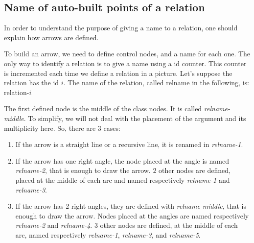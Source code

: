 \documentclass[a4paper,11pt]{report}
\begin{document}
\medskip

\begin{minipage}{0.5\textwidth}

\end{minipage}
\begin{minipage}{0.4\textwidth}
\begin{center}
\end{center}
\end{minipage}

\subsection{Name of auto-built points of a relation}\label{ss.relptname}

In order to understand the purpose of giving a name to a relation, one should explain how arrows are defined.

To build an arrow, we need to define control nodes, and a name for each one. The only way to identify a relation is to give a name using a id counter. This counter is incremented each time we define a relation in a picture.
Let's suppose the relation has the id $i$. The name of the relation, called relname in the following, is: relation-$i$

The first defined node is the middle of the class nodes. It is called {\it relname-middle}. To simplify, we will not deal with the placement of the argument and its multiplicity here. So, there are 3 cases:

\begin{enumerate}
\item If the arrow is a straight line or a recursive line, it is renamed in {\it relname-1}.

\begin{center}
\end{center}

\item If the arrow has one right angle, the node placed at the angle is named {\it relname-2}, that is enough to draw the arrow. 2 other nodes are defined, placed at the middle of each arc and named respectively {\it relname-1} and {\it relname-3}.

\begin{center}
\end{center}

\item If the arrow has 2 right angles, they are defined with
{\it relname-middle}, that is enough to draw the arrow. Nodes placed at the angles are named respectively {\it relname-2} and {\it relname-4}. 3 other nodes are defined, at the middle of each arc, 
named respectively {\it relname-1}, {\it relname-3}, and {\it relname-5}.

\begin{center}
\end{center}
\end{enumerate}
\end{document}
